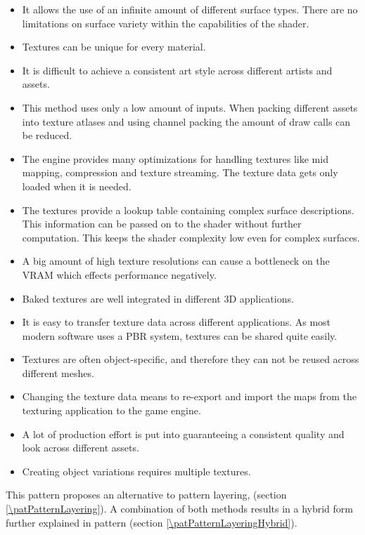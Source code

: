 \begin{description}
\begin{description}
\begin{itemize}
				\item It allows the use of an infinite amount of different surface types. There are no limitations on surface variety within the capabilities of the shader.   
				\item Textures can be unique for every material.
				\item It is difficult to achieve a consistent art style across different artists and assets. 
			\end{itemize}
			\item[\performance:]\hfill
			\begin{itemize}\mynobreakpar
				\item This method uses only a low amount of inputs. When packing different assets into texture atlases and using channel packing the amount of draw calls can be reduced. 
				\item The engine provides many optimizations for handling textures like mid mapping, compression and texture streaming. The texture data gets only loaded when it is needed. 
				\item The textures provide a lookup table containing complex surface descriptions. This information can be passed on to the shader without further computation. This keeps the shader complexity low even for complex surfaces. 
				\item A big amount of high texture resolutions can cause a bottleneck on the VRAM which effects performance negatively. 
			\end{itemize}
			\item[\pipeline:]\hfill
			\begin{itemize}\mynobreakpar
				\item Baked textures are well integrated in different 3D applications. 
				\item It is easy to transfer texture data across different applications. As most modern software uses a PBR system, textures can be shared quite easily.   
				\item Textures are often object-specific, and therefore they can not be reused across different meshes. 
				\item Changing the texture data means to re-export and import the maps from the texturing application to the game engine. 
				\item A lot of production effort is put into guaranteeing a consistent quality and look across different assets. 
				\item Creating object variations requires multiple textures.   
			\end{itemize}
		\end{description}
	\item[\patRelations:]%
	This pattern proposes an alternative to pattern layering, \emph{\patPatternLayering} (section \ref{\patPatternLayering}). A combination of both methods results in a hybrid form further explained in pattern \emph{\patPatternLayeringHybrid} (section \ref{\patPatternLayeringHybrid}).
	
\end{description}


